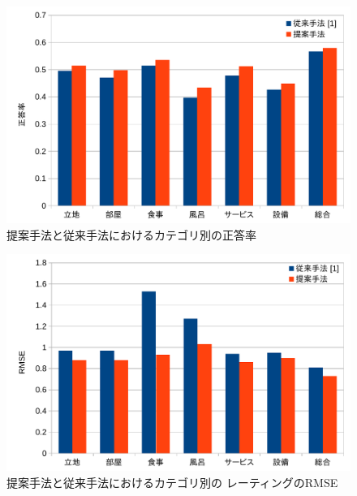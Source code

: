 \begin{figure}
  \includegraphics{fig/graph_of_accuracies_per_category.pdf}
  \caption{提案手法と従来手法\cite{fujitani15}におけるカテゴリ別の正答率}
  \label{fig:AccuraciesPerCategory}
\end{figure}

\begin{figure}
  \includegraphics{fig/graph_of_rmses_per_category.pdf}
  \caption{提案手法と従来手法\cite{fujitani15}におけるカテゴリ別の
           レーティングのRMSE}
  \label{fig:RMSEsPerCategory}
\end{figure}
